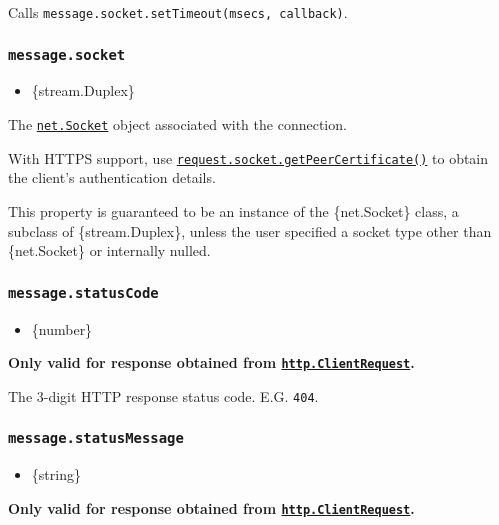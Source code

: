 Calls \texttt{message.socket.setTimeout(msecs,\ callback)}.

\subsubsection{\texorpdfstring{\texttt{message.socket}}{message.socket}}\label{message.socket}

\begin{itemize}
\tightlist
\item
  \{stream.Duplex\}
\end{itemize}

The \href{net.md\#class-netsocket}{\texttt{net.Socket}} object
associated with the connection.

With HTTPS support, use
\href{tls.md\#tlssocketgetpeercertificatedetailed}{\texttt{request.socket.getPeerCertificate()}}
to obtain the client's authentication details.

This property is guaranteed to be an instance of the \{net.Socket\}
class, a subclass of \{stream.Duplex\}, unless the user specified a
socket type other than \{net.Socket\} or internally nulled.

\subsubsection{\texorpdfstring{\texttt{message.statusCode}}{message.statusCode}}\label{message.statuscode}

\begin{itemize}
\tightlist
\item
  \{number\}
\end{itemize}

\textbf{Only valid for response obtained from
\hyperref[class-httpclientrequest]{\texttt{http.ClientRequest}}.}

The 3-digit HTTP response status code. E.G. \texttt{404}.

\subsubsection{\texorpdfstring{\texttt{message.statusMessage}}{message.statusMessage}}\label{message.statusmessage}

\begin{itemize}
\tightlist
\item
  \{string\}
\end{itemize}

\textbf{Only valid for response obtained from
\hyperref[class-httpclientrequest]{\texttt{http.ClientRequest}}.}


